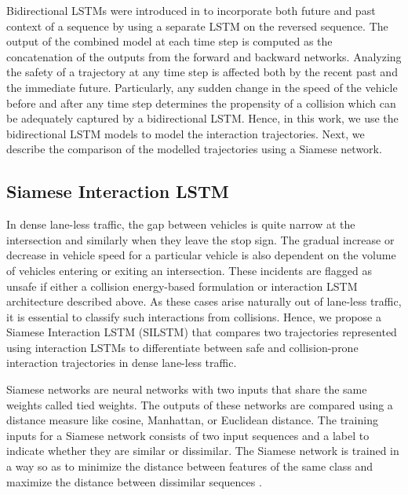 \documentclass[final,journal]{IEEEtran}
\begin{document}
Bidirectional LSTMs were introduced in \cite{bilstm} to incorporate both future and past context of a sequence by using a separate LSTM on the reversed sequence. The output of the combined model at each time step is computed as the concatenation of the outputs from the forward and backward networks. Analyzing the safety of a trajectory at any time step is affected both by the recent past and the immediate future. Particularly, any sudden change in the speed of the vehicle before and after any time step determines the propensity of a collision which can be adequately captured by a bidirectional LSTM. Hence, in this work, we use the bidirectional LSTM models to model the interaction trajectories. Next, we describe the comparison of the modelled trajectories using a Siamese network.

\subsection{Siamese Interaction LSTM}
In dense lane-less traffic, the gap between vehicles is quite narrow at the intersection and similarly when they leave the stop sign. The gradual increase or decrease in vehicle speed for a particular vehicle is also dependent on the volume of vehicles entering or exiting an intersection. These incidents are flagged as unsafe if either a collision energy-based formulation  \cite{social_etiquette} or interaction LSTM architecture described above. As these cases arise naturally out of lane-less traffic, it is essential to classify such interactions from collisions. Hence, we propose a Siamese Interaction LSTM (SILSTM) that compares two trajectories represented using interaction LSTMs to differentiate between safe and collision-prone interaction trajectories in dense lane-less traffic. 

Siamese networks \cite{siameseog} are neural networks with two inputs that share the same weights called tied weights. The outputs of these networks are compared using a distance measure like cosine, Manhattan, or Euclidean distance. The training inputs for a Siamese network consists of two input sequences and a label to indicate whether they are similar or dissimilar. The Siamese network is trained in a way so as to minimize the distance between features of the same class and maximize the distance between dissimilar sequences \cite{siameselstm}.
\end{document}
